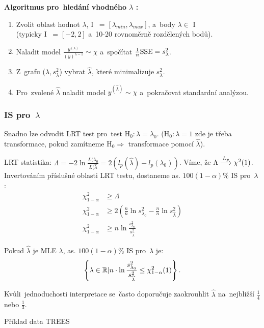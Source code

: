 \textbf{Algoritmus pro~hledání vhodného $\lambda$ :}
\begin{enumerate}
\item Zvolit oblast hodnot $\lambda$, I~ = $[\lambda_{min}, \lambda_{max}]$, a~body $\lambda \in$ I~\\
(typicky I~ = $[-2,2]$ a~10-20 rovnoměrně rozdělených bodů).

\item Naladit model $\frac{y^{(\lambda)}}{(\dot{y})^{\lambda-1}} \sim \chi$ a~spočítat $\frac{1}{n}\mathrm{SSE} = s_{\lambda}^2$.

\item Z~grafu ($\lambda, s_{\lambda}^2$) vybrat $\widehat{\lambda}$, které minimalizuje $s_{\lambda}^2$.

\item Pro~zvolené $\widehat{\lambda}$ naladit model $y^{(\widehat{\lambda})} \sim \chi$ a~pokračovat standardní analýzou.
\end{enumerate}
\subsubsection*{IS pro~$\lambda$ }
Snadno lze odvodit LRT test pro~test $\text{H}_0 : \lambda = \lambda_0$. ($\text{H}_0 : \lambda = 1$ zde je třeba transformace, pokud zamítneme $\text{H}_0 \Rightarrow$ transformace pomocí $\widehat{\lambda}$).

LRT statistika: $\Lambda = -2 \ln \frac{L(\lambda_0}{L(\widehat{\lambda}} = 2 (l_p(\widehat{\lambda}) - l_p(\lambda_0))$. Víme, že $\Lambda \stackrel{L_p}{\longrightarrow} \chi^2(1)$. Invertováním příslušné oblasti LRT testu, dostaneme as. $100(1-\alpha)\%$ IS pro~$\lambda$ :
\begin{align*}
 \chi^2_{1-\alpha} & \geq \Lambda \\
\chi^2_{1-\alpha} & \geq 2(\frac{n}{n}\ln s^2_{\lambda_0} - \frac{n}{n}\ln s^2_{\widehat{\lambda}}) \\
\chi^2_{1-\alpha} & \geq n \ln\frac{s^2_{\lambda_0}}{s^2_{\widehat{\lambda}}}
\end{align*}

Pokud $\widehat{\lambda}$ je MLE $\lambda$, as. $100(1-\alpha)\%$ IS  pro~$\lambda$ je:
 $$
 \left\{ \lambda \in \mathbb{R} | n \cdot \ln\frac{s^2_{\lambda_0}}{s^2_{\widehat{\lambda}}} \leq \chi^2_{1-\alpha}(1) \right\}.
 $$
\begin{remark}
 Kvůli~jednoduchosti interpretace se~často doporučuje zaokrouhlit $\widehat{\lambda}$ na~nejbližší $\frac{1}{4}$ nebo $\frac{1}{3}$.
\end{remark}
Příklad data TREES

